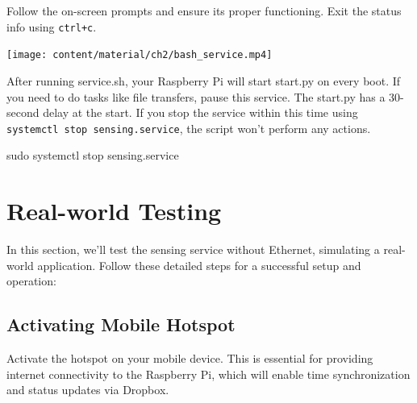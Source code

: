 \documentclass[
  letterpaper,
]{scrbook}
\newenvironment{Shaded}{\begin{snugshade}}{\end{snugshade}}
\newcommand{\FunctionTok}[1]{\textcolor[rgb]{0.28,0.35,0.67}{#1}}
\newcommand{\NormalTok}[1]{\textcolor[rgb]{0.00,0.23,0.31}{#1}}
\begin{document}
Follow the on-screen prompts and ensure its proper functioning. Exit the
status info using \texttt{ctrl+c}.

\texttt{[image: content/material/ch2/bash\_service.mp4]}

\begin{tcolorbox}[enhanced jigsaw, left=2mm, coltitle=black, colframe=quarto-callout-note-color-frame, bottomrule=.15mm, colback=white, bottomtitle=1mm, breakable, colbacktitle=quarto-callout-note-color!10!white, titlerule=0mm, toptitle=1mm, arc=.35mm, rightrule=.15mm, opacityback=0, title=\textcolor{quarto-callout-note-color}{\faInfo}\hspace{0.5em}{Note}, toprule=.15mm, leftrule=.75mm, opacitybacktitle=0.6]

After running service.sh, your Raspberry Pi will start start.py on every
boot. If you need to do tasks like file transfers, pause this service.
The start.py has a 30-second delay at the start. If you stop the service
within this time using \texttt{systemctl\ stop\ sensing.service}, the
script won't perform any actions.

\begin{Shaded}
\begin{Highlighting}[]
\FunctionTok{sudo}\NormalTok{ systemctl stop sensing.service}
\end{Highlighting}
\end{Shaded}

\end{tcolorbox}

\hypertarget{real-world-testing}{%
\section{Real-world Testing}\label{real-world-testing}}

In this section, we'll test the sensing service without Ethernet,
simulating a real-world application. Follow these detailed steps for a
successful setup and operation:

\hypertarget{activating-mobile-hotspot}{%
\subsection{Activating Mobile Hotspot}\label{activating-mobile-hotspot}}

Activate the hotspot on your mobile device. This is essential for
providing internet connectivity to the Raspberry Pi, which will enable
time synchronization and status updates via Dropbox.
\end{document}
